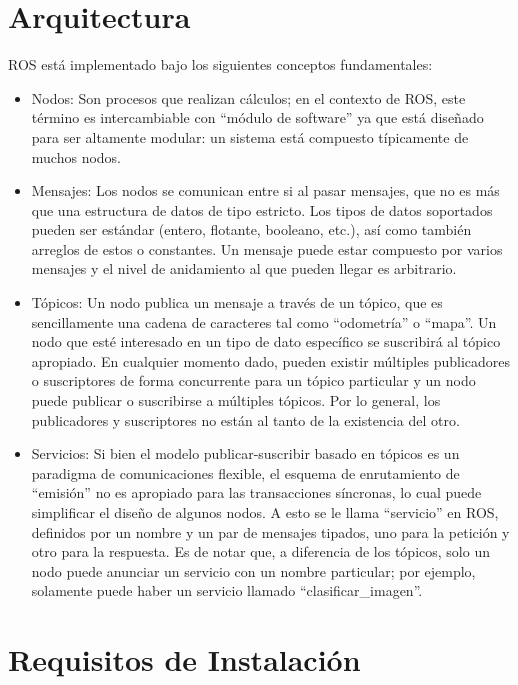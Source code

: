 \section{Arquitectura}

ROS está implementado bajo los siguientes conceptos fundamentales:

\begin{itemize}
	\itemsep1pt \parskip1pt 
	\item Nodos: Son procesos que realizan cálculos; en el contexto de ROS, este término es intercambiable con ``módulo de software'' ya que está diseñado para ser altamente modular: un sistema está compuesto típicamente de muchos nodos.

	\item Mensajes:	Los nodos se comunican entre si al pasar mensajes, que no es más que una estructura de datos de tipo estricto. Los tipos de datos soportados pueden ser estándar (entero, flotante, booleano, etc.), así como también arreglos de estos o constantes. Un mensaje puede estar compuesto por varios mensajes y el nivel de anidamiento al que pueden llegar es arbitrario.

	\item Tópicos: Un nodo publica un mensaje a través de un tópico, que es sencillamente una cadena de caracteres tal como ``odometría'' o ``mapa''. Un nodo que esté interesado en un tipo de dato específico se suscribirá al tópico apropiado. En cualquier momento dado, pueden existir múltiples publicadores o suscriptores de forma concurrente para un tópico particular y un nodo puede publicar o suscribirse a múltiples tópicos. Por lo general, los publicadores y suscriptores no están al tanto de la existencia del otro.

	\item Servicios: Si bien el modelo publicar-suscribir basado en tópicos es un paradigma de comunicaciones flexible, el esquema de enrutamiento de ``emisión'' no es apropiado para las transacciones síncronas, lo cual puede simplificar el diseño de algunos nodos. A esto se le llama ``servicio'' en ROS, definidos por un nombre y un par de mensajes tipados, uno para la petición y otro para la respuesta. Es de notar que, a diferencia de los tópicos, solo un nodo puede anunciar un servicio con un nombre particular; por ejemplo, solamente puede haber un servicio llamado ``clasificar\_imagen''. \cite{quigley2009ros}
\end{itemize}

\section{Requisitos de Instalación}

